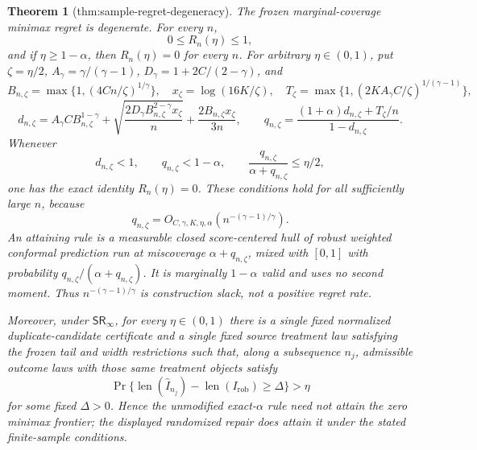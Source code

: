 \documentclass{article}
\newtheorem{theorem}{Theorem}
\begin{document}
\begin{theorem}[thm:sample-regret-degeneracy]\label{thm:sample-regret-degeneracy}
The frozen marginal-coverage minimax regret is degenerate. For every \(n\),
\[
0\le R_n(\eta)\le1,
\]
and if \(\eta\ge1-\alpha\), then \(R_n(\eta)=0\) for every \(n\). For arbitrary \(\eta\in(0,1)\), put \(\zeta=\eta/2\), \(A_\gamma=\gamma/(\gamma-1)\), \(D_\gamma=1+2C/(2-\gamma)\), and
\[
B_{n,\zeta}=\max\{1,(4Cn/\zeta)^{1/\gamma}\},\quad
x_\zeta=\log(16K/\zeta),\quad
T_\zeta=\max\{1,(2KA_\gamma C/\zeta)^{1/(\gamma-1)}\},
\]
\[
d_{n,\zeta}
 =A_\gamma C B_{n,\zeta}^{1-\gamma}
 +\sqrt{\frac{2D_\gamma B_{n,\zeta}^{2-\gamma}x_\zeta}{n}}
 +\frac{2B_{n,\zeta}x_\zeta}{3n},
\qquad
q_{n,\zeta}
 =\frac{(1+\alpha)d_{n,\zeta}+T_\zeta/n}
        {1-d_{n,\zeta}}.
\]
Whenever
\[
d_{n,\zeta}<1,\qquad q_{n,\zeta}<1-\alpha,\qquad
\frac{q_{n,\zeta}}{\alpha+q_{n,\zeta}}\le\eta/2,
\]
one has the exact identity \(R_n(\eta)=0\). These conditions hold for all sufficiently large \(n\), because
\[
q_{n,\zeta}
 =O_{C,\gamma,K,\eta,\alpha}
   (n^{-(\gamma-1)/\gamma}).
\]
An attaining rule is a measurable closed score-centered hull of robust weighted conformal prediction run at miscoverage \(\alpha+q_{n,\zeta}\), mixed with \([0,1]\) with probability \(q_{n,\zeta}/(\alpha+q_{n,\zeta})\). It is marginally \(1-\alpha\) valid and uses no second moment. Thus \(n^{-(\gamma-1)/\gamma}\) is construction slack, not a positive regret rate.

Moreover, under \(\mathsf{SR}_\infty\), for every \(\eta\in(0,1)\) there is a single fixed normalized duplicate-candidate certificate and a single fixed source treatment law satisfying the frozen tail and width restrictions such that, along a subsequence \(n_j\), admissible outcome laws with those same treatment objects satisfy
\[
\Pr\{\operatorname{len}(\widehat I_{n_j})
-\operatorname{len}(I_{\mathrm{rob}})\ge\Delta\}>\eta
\]
for some fixed \(\Delta>0\). Hence the unmodified exact-\(\alpha\) rule need not attain the zero minimax frontier; the displayed randomized repair does attain it under the stated finite-sample conditions.
\end{theorem}
\end{document}
